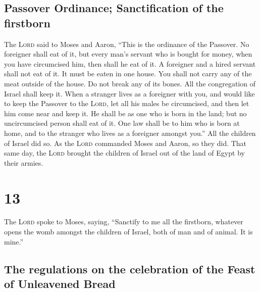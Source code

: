 \hypertarget{passover-ordinance-sanctification-of-the-firstborn}{%
\subsection{Passover Ordinance; Sanctification of the
firstborn}\label{passover-ordinance-sanctification-of-the-firstborn}}

 The \textsc{Lord} said to Moses and Aaron, ``This is the
ordinance of the Passover. No foreigner shall eat of it, 
but every man's servant who is bought for money, when you have
circumcised him, then shall he eat of it.  A foreigner
and a hired servant shall not eat of it.  It must be
eaten in one house. You shall not carry any of the meat outside of the
house. Do not break any of its bones.  All the
congregation of Israel shall keep it.  When a stranger
lives as a foreigner with you, and would like to keep the Passover to
the \textsc{Lord}, let all his males be circumcised, and then let him
come near and keep it. He shall be as one who is born in the land; but
no uncircumcised person shall eat of it.  One law shall
be to him who is born at home, and to the stranger who lives as a
foreigner amongst you.''  All the children of Israel did
so. As the \textsc{Lord} commanded Moses and Aaron, so they did.
 That same day, the \textsc{Lord} brought the children of
Israel out of the land of Egypt by their armies.

\hypertarget{section-12}{%
\section{13}\label{section-12}}

 The \textsc{Lord} spoke to Moses, saying, 
``Sanctify to me all the firstborn, whatever opens the womb amongst the
children of Israel, both of man and of animal. It is mine.''

\hypertarget{the-regulations-on-the-celebration-of-the-feast-of-unleavened-bread}{%
\subsection{The regulations on the celebration of the Feast of
Unleavened
Bread}\label{the-regulations-on-the-celebration-of-the-feast-of-unleavened-bread}}

